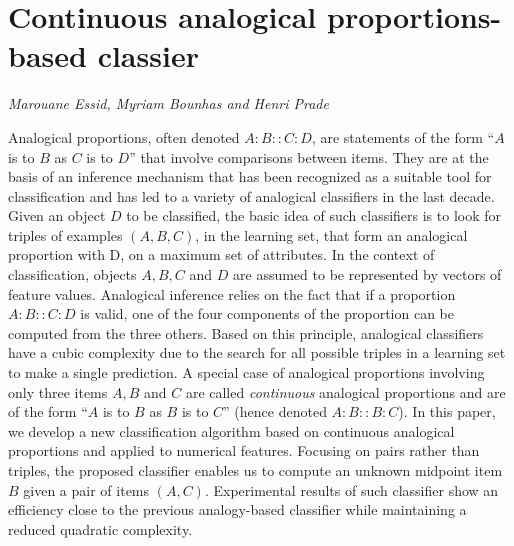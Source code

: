 \documentclass[../booklet.tex]{subfiles}
\begin{document}
\section[Continuous analogical proportions-based classier. {\it Marouane Essid, Myriam Bounhas and Henri Prade}]{Continuous analogical proportions-based classier}
  

\begin{center}
  {\it Marouane Essid, Myriam Bounhas and Henri Prade}
\end{center}

\vskip 0.8cm


Analogical proportions, often denoted $A:B::C:D$,  are statements of the form ``$A$ is to $B$ as $C$ is to $D$'' that involve comparisons between items. They are at the basis of an inference mechanism that has been recognized as a suitable tool for classification and has led to a variety of analogical classifiers in the last decade. Given an object $D$ to be classified, the basic idea of such classifiers is to look
for triples of examples $(A, B, C)$, in the learning set, that form an analogical proportion with D, on a maximum set of attributes. In the context of classification, objects $A, B, C$ and $D$ are assumed to be represented by vectors of feature values. Analogical inference relies on the fact that if a proportion $A:B::C:D$ is valid, one of the four components of the proportion can be computed from the three others. Based on this principle, analogical classifiers have a cubic complexity due to the search for all possible triples in a learning set to make a single prediction.
A special case of analogical proportions involving only three items $A, B$ and $C$ are called \textit{continuous} analogical proportions and are of the form ``$A$ is to $B$ as $B$ is to $C$'' (hence  denoted $A:B::B:C$). In this paper, we develop a new classification algorithm based on continuous analogical proportions and applied to numerical features. Focusing on pairs rather than triples, the proposed classifier enables us to compute an unknown midpoint item $B$ given a pair of items $(A,C)$. Experimental results of such classifier show an efficiency close to the previous analogy-based classifier while maintaining a reduced quadratic complexity.

\end{document}
